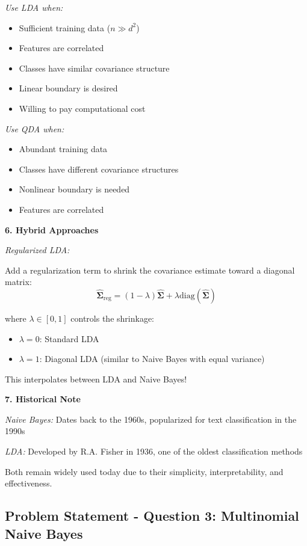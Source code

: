 \documentclass[12pt]{article}
\begin{document}
\begin{explanation}
\textit{Use LDA when:}
\begin{itemize}
    \item Sufficient training data ($n \gg d^2$)
    \item Features are correlated
    \item Classes have similar covariance structure
    \item Linear boundary is desired
    \item Willing to pay computational cost
\end{itemize}

\textit{Use QDA when:}
\begin{itemize}
    \item Abundant training data
    \item Classes have different covariance structures
    \item Nonlinear boundary is needed
    \item Features are correlated
\end{itemize}

\textbf{6. Hybrid Approaches}

\textit{Regularized LDA:}

Add a regularization term to shrink the covariance estimate toward a diagonal matrix:
\[
\hat{\boldsymbol{\Sigma}}_{\text{reg}} = (1-\lambda)\hat{\boldsymbol{\Sigma}} + \lambda \text{diag}(\hat{\boldsymbol{\Sigma}})
\]

where $\lambda \in [0, 1]$ controls the shrinkage:
\begin{itemize}
    \item $\lambda = 0$: Standard LDA
    \item $\lambda = 1$: Diagonal LDA (similar to Naive Bayes with equal variance)
\end{itemize}

This interpolates between LDA and Naive Bayes!

\textbf{7. Historical Note}

\textit{Naive Bayes:} Dates back to the 1960s, popularized for text classification in the 1990s

\textit{LDA:} Developed by R.A. Fisher in 1936, one of the oldest classification methods

Both remain widely used today due to their simplicity, interpretability, and effectiveness.
\end{explanation}

\newpage
\subsection{Problem Statement - Question 3: Multinomial Naive Bayes}
\end{document}
